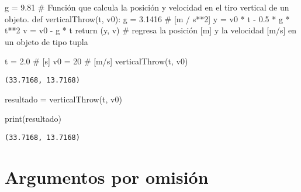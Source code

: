 \documentclass[
  letterpaper,
  DIV=11,
  numbers=noendperiod]{scrreprt}
\newenvironment{Shaded}{\begin{snugshade}}{\end{snugshade}}
\newcommand{\BuiltInTok}[1]{\textcolor[rgb]{0.00,0.23,0.31}{#1}}
\newcommand{\CommentTok}[1]{\textcolor[rgb]{0.37,0.37,0.37}{#1}}
\newcommand{\ControlFlowTok}[1]{\textcolor[rgb]{0.00,0.23,0.31}{#1}}
\newcommand{\DecValTok}[1]{\textcolor[rgb]{0.68,0.00,0.00}{#1}}
\newcommand{\FloatTok}[1]{\textcolor[rgb]{0.68,0.00,0.00}{#1}}
\newcommand{\KeywordTok}[1]{\textcolor[rgb]{0.00,0.23,0.31}{#1}}
\newcommand{\NormalTok}[1]{\textcolor[rgb]{0.00,0.23,0.31}{#1}}
\newcommand{\OperatorTok}[1]{\textcolor[rgb]{0.37,0.37,0.37}{#1}}
\begin{document}
\begin{Shaded}
\begin{Highlighting}[]
\NormalTok{g }\OperatorTok{=} \FloatTok{9.81}
\CommentTok{\# Función que calcula la posición y velocidad en el tiro vertical de un objeto.}
\KeywordTok{def}\NormalTok{ verticalThrow(t, v0): }
\NormalTok{    g }\OperatorTok{=} \FloatTok{3.1416} \CommentTok{\# [m / s**2]}
\NormalTok{    y }\OperatorTok{=}\NormalTok{ v0 }\OperatorTok{*}\NormalTok{ t }\OperatorTok{{-}} \FloatTok{0.5} \OperatorTok{*}\NormalTok{ g }\OperatorTok{*}\NormalTok{ t}\OperatorTok{**}\DecValTok{2} 
\NormalTok{    v }\OperatorTok{=}\NormalTok{ v0 }\OperatorTok{{-}}\NormalTok{ g }\OperatorTok{*}\NormalTok{ t }
    \ControlFlowTok{return}\NormalTok{ (y, v)  }\CommentTok{\# regresa la posición [m] y la velocidad [m/s] en un objeto de tipo tupla}
\end{Highlighting}
\end{Shaded}

\begin{Shaded}
\begin{Highlighting}[]
\NormalTok{t }\OperatorTok{=} \FloatTok{2.0}   \CommentTok{\# [s]}
\NormalTok{v0 }\OperatorTok{=} \DecValTok{20}   \CommentTok{\# [m/s]}
\NormalTok{verticalThrow(t, v0)}
\end{Highlighting}
\end{Shaded}

\begin{verbatim}
(33.7168, 13.7168)
\end{verbatim}

\begin{Shaded}
\begin{Highlighting}[]
\NormalTok{resultado }\OperatorTok{=}\NormalTok{ verticalThrow(t, v0)}
\end{Highlighting}
\end{Shaded}

\begin{Shaded}
\begin{Highlighting}[]
\BuiltInTok{print}\NormalTok{(resultado)}
\end{Highlighting}
\end{Shaded}

\begin{verbatim}
(33.7168, 13.7168)
\end{verbatim}


\chapter{Argumentos por omisión}\label{argumentos-por-omisiuxf3n}
\end{document}

